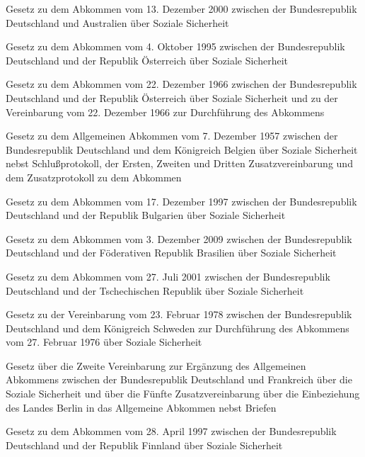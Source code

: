 \item[{SozSichAbkAUSG}] Gesetz zu dem Abkommen vom 13. Dezember 2000 zwischen der Bundesrepublik Deutschland und Australien über Soziale Sicherheit

\item[{SozSichAbkAUT1995G}] Gesetz zu dem Abkommen vom 4. Oktober 1995 zwischen der Bundesrepublik Deutschland und der Republik Österreich über Soziale Sicherheit

\item[{SozSichAbkAUTG}] Gesetz zu dem Abkommen vom 22. Dezember 1966 zwischen der Bundesrepublik Deutschland und der Republik Österreich über Soziale Sicherheit und zu der Vereinbarung vom 22. Dezember 1966 zur Durchführung des Abkommens

\item[{SozSichAbkBELG}] Gesetz zu dem Allgemeinen Abkommen vom 7. Dezember 1957 zwischen der Bundesrepublik Deutschland und dem Königreich Belgien über Soziale Sicherheit nebst Schlußprotokoll, der Ersten, Zweiten und Dritten Zusatzvereinbarung und dem Zusatzprotokoll zu dem Abkommen

\item[{SozSichAbkBGRG}] Gesetz zu dem Abkommen vom 17. Dezember 1997 zwischen der Bundesrepublik Deutschland und der Republik Bulgarien über Soziale Sicherheit

\item[{SozSichAbkBRAG}] Gesetz zu dem Abkommen vom 3. Dezember 2009 zwischen der Bundesrepublik Deutschland und der Föderativen Republik Brasilien über Soziale Sicherheit

\item[{SozSichAbkCZEG}] Gesetz zu dem Abkommen vom 27. Juli 2001 zwischen der Bundesrepublik Deutschland und der Tschechischen Republik über Soziale Sicherheit

\item[{SozSichAbkDVbgSWEG}] Gesetz zu der Vereinbarung vom 23. Februar 1978 zwischen der Bundesrepublik Deutschland und dem Königreich Schweden zur Durchführung des Abkommens vom 27. Februar 1976 über Soziale Sicherheit

\item[{SozSichAbkErgVbg2FRAG}] Gesetz über die Zweite Vereinbarung zur Ergänzung des Allgemeinen Abkommens zwischen der Bundesrepublik Deutschland und Frankreich über die Soziale Sicherheit und über die Fünfte Zusatzvereinbarung über die Einbeziehung des Landes Berlin in das Allgemeine Abkommen nebst Briefen

\item[{SozSichAbkFIN1997G}] Gesetz zu dem Abkommen vom 28. April 1997 zwischen der Bundesrepublik Deutschland und der Republik Finnland über Soziale Sicherheit

